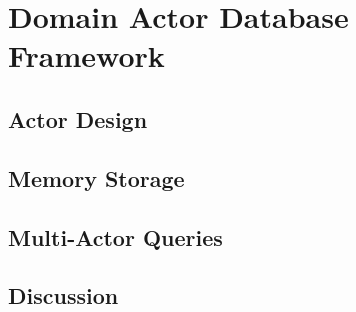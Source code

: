 
\section{Domain Actor Database Framework}\label{sec:framework}

\subsection{Actor Design}

\subsection{Memory Storage}

\subsection{Multi-Actor Queries}

\subsection{Discussion}
